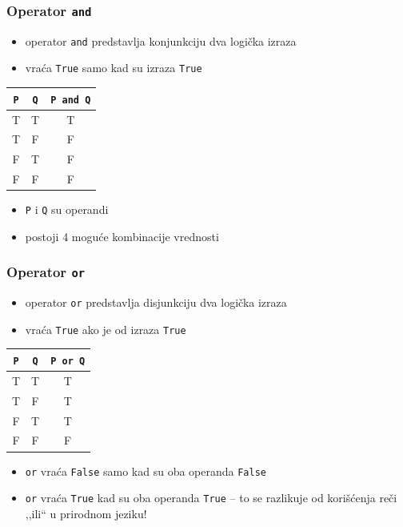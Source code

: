 \documentclass[utf8,compress]{beamer}
\begin{document}
\begin{frame}[fragile]
  \frametitle{Operator \texttt{and}}
  \begin{itemize}
    \item operator \texttt{and} predstavlja konjunkciju dva logička izraza
    \item vraća \texttt{True} samo kad su  izraza \texttt{True}
  \end{itemize}
  \begin{center}
  \begin{tabular}{c|c|c}
    \texttt{P} & \texttt{Q} & \texttt{P and Q} \\ \hline
    T & T & T \\ \hline
    T & F & F \\ \hline
    F & T & F \\ \hline
    F & F & F
  \end{tabular}
  \end{center}
  \begin{itemize}
    \item \texttt{P} i \texttt{Q} su operandi
    \item postoji 4 moguće kombinacije vrednosti
  \end{itemize}
\end{frame}

\begin{frame}[fragile]
  \frametitle{Operator \texttt{or}}
  \begin{itemize}
    \item operator \texttt{or} predstavlja disjunkciju dva logička izraza
    \item vraća \texttt{True} ako je  od izraza \texttt{True}
  \end{itemize}
  \begin{center}
  \begin{tabular}{c|c|c}
    \texttt{P} & \texttt{Q} & \texttt{P or Q} \\ \hline
    T & T & T \\ \hline
    T & F & T \\ \hline
    F & T & T \\ \hline
    F & F & F
  \end{tabular}
  \end{center}
  \begin{itemize}
    \item \texttt{or} vraća \texttt{False} samo kad su oba operanda \texttt{False}
    \item \texttt{or} vraća \texttt{True} kad su oba operanda \texttt{True} -- to se razlikuje od korišćenja reči ,,ili`` u prirodnom jeziku!
  \end{itemize}
\end{frame}
\end{document}
